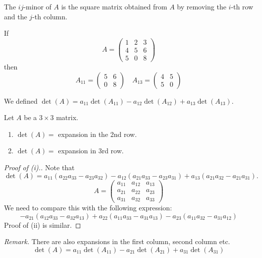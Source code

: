 \documentclass[10pt]{scrartcl}
\begin{document}
\begin{definition}
The $ij$-minor of $A$ is the square matrix obtained from $A$ by removing the $i$-th row and the $j$-th column. 	
\end{definition}\vsp

\begin{example}
If \[
  A = \begin{pmatrix}
 1 & 2 & 3\\
 4 & 5 & 6\\
 5 & 0 & 8	
 \end{pmatrix}
\]
then 
\[
  A_{11}  = \begin{pmatrix}
 5 & 6 \\ 0 & 8 	
 \end{pmatrix}\quad 
A_{13} = \begin{pmatrix}
 4 & 5 \\ 5 & 0	
 \end{pmatrix}
\]	
\end{example}\vsp

We defined $\det(A) = a_{11}\det(A_{11}) - a_{12}\det(A_{12}) + a_{13}\det(A_{13})$. \\

\begin{proposition}
Let $A$ be a $3 \times 3$ matrix. 
\begin{enumerate}
\item $\det(A) = $ expansion in the 2nd row.
\item $\det(A) = $ expansion in 3rd row.
\end{enumerate}	
\end{proposition}
\begin{proof}[Proof of (i).]
Note that 
\[\det(A) = a_{11}(a_{22}a_{33} - a_{23}a_{32}) - a_{12}(a_{21}a_{33} - a_{23}a_{31}) + a_{13}(a_{21}a_{32} - a_{21}a_{31}).
\]
\[
  A = \begin{pmatrix}
 a_{11} & a_{12} & a_{13}\\
 a_{21} & a_{22} & a_{23}\\
 a_{31} & a_{32} & a_{33}	
 \end{pmatrix}
\]
We need to compare this with the following expression: 
\[
  -a_{21}(a_{12}a_{33} - a_{32}a_{13}) + a_{22}(a_{11}a_{33} - a_{31}a_{13}) - a_{23}(a_{11}a_{32} - a_{31}a_{12})
\]
Proof of (ii) is similar.	
\end{proof}\vsp

\emph{Remark.} There are also expansions in the first column, second column etc.
\[
  \det(A) = a_{11}\det(A_{11}) - a_{21}\det(A_{21}) + a_{31}\det(A_{31})
\]
\end{document}

